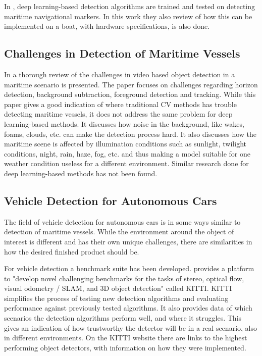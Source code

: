 \vspace{3mm}

In \citep{Goring2017}, deep learning-based detection algorithms are trained and tested on detecting maritime navigational markers. In this work they also review of how this can be implemented on a boat, with hardware specifications, is also done. 


\subsection{Challenges in Detection of Maritime Vessels}

In \citep{Challenges2016} a thorough review of the challenges in video based object detection in a maritime scenario is presented. The paper focuses on challenges regarding horizon detection, background subtraction, foreground detection and tracking. While this paper gives a good indication of where traditional CV methods has trouble detecting maritime vessels, it does not address the same problem for deep learning-based methods. It discusses how noise in the background, like wakes, foams, clouds, etc. can make the detection process hard. It also discusses how the maritime scene is affected by illumination conditions such as sunlight, twilight conditions, night, rain, haze, fog, etc. and thus making a model suitable for one weather condition useless for a different environment. Similar research done for deep learning-based methods has not been found.




\subsection{Vehicle Detection for Autonomous Cars}

The field of vehicle detection for autonomous cars is in some ways similar to detection of maritime vessels. While the environment around the object of interest is different and has their own unique challenges, there are similarities in how the desired finished product should be. 

\vspace{3mm}

For vehicle detection a benchmark suite has been developed. \citep{KITTI} provides a platform to "develop novel challenging benchmarks for the tasks of stereo, optical flow, visual odometry / SLAM, and 3D object detection" called KITTI. KITTI simplifies the process of testing new detection algorithms and evaluating performance against previously tested algorithms. It also provides data of which scenarios the detection algorithms perform well, and where it struggles. This gives an indication of how trustworthy the detector will be in a real scenario, also in different environments. On the KITTI website there are links to the highest performing object detectors, with information on how they were implemented.

